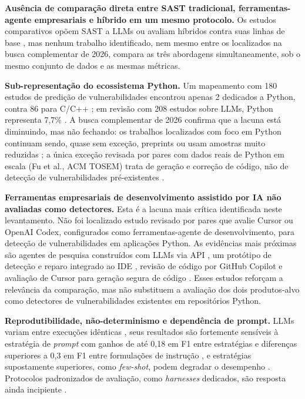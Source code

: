 \textbf{Ausência de comparação direta entre SAST tradicional, ferramentas-agente empresariais e híbrido em um mesmo protocolo.} Os estudos comparativos opõem SAST a LLMs \cite{Ozturk2023AIvsSAST, Tamberg2025LLMHarness, Gnieciak2025LLMvsSAST, Zhou2024SASTLLMRepo} ou avaliam híbridos contra suas linhas de base \cite{Ciavatta2026LLMSAST, Ameen2026QASecClaw}, mas nenhum trabalho identificado, nem mesmo entre os localizados na busca complementar de 2026, compara as três abordagens simultaneamente, sob o mesmo conjunto de dados e as mesmas métricas.

\textbf{Sub-representação do ecossistema Python.} Um mapeamento com 180 estudos de predição de vulnerabilidades encontrou apenas 2 dedicados a Python, contra 86 para C/C++ \cite{Kalouptsoglou2023VulnPrediction}; em revisão com 208 estudos sobre LLMs, Python representa 7,7\% \cite{Germano2025LLMSLR}. A busca complementar de 2026 confirma que a lacuna está diminuindo, mas não fechando: os trabalhos localizados com foco em Python continuam sendo, quase sem exceção, preprints \cite{Pellew2026RealVuln, Marquer2026SAGA, Tsigkourakos2026QRS, Zhou2024SASTLLMRepo, Adnan2026ALPHA} ou usam amostras muito reduzidas \cite{Farasat2025PythonSecurity}; a única exceção revisada por pares com dados reais de Python em escala (Fu et al., ACM TOSEM) trata de geração e correção de código, não de detecção de vulnerabilidades pré-existentes \cite{Fu2025CopilotSecurity}.

\textbf{Ferramentas empresariais de desenvolvimento assistido por IA não avaliadas como detectores.} Esta é a lacuna mais crítica identificada neste levantamento. Não foi localizado estudo revisado por pares que avalie Cursor ou OpenAI Codex, configurados como ferramentas-agente de desenvolvimento, para detecção de vulnerabilidades em aplicações Python. As evidências mais próximas são agentes de pesquisa construídos com LLMs via API \cite{Yildiz2025LLMAgents, Widyasari2026VulTrial}, um protótipo de detecção e reparo integrado ao IDE \cite{Steenhoek2025IDEUserStudy}, revisão de código por GitHub Copilot \cite{Amro2025CopilotReview} e avaliação de Cursor para geração segura de código \cite{Nie2025SecCodePLT}. Esses estudos reforçam a relevância da comparação, mas não substituem a avaliação dos dois produtos-alvo como detectores de vulnerabilidades existentes em repositórios Python.

\textbf{Reprodutibilidade, não-determinismo e dependência de prompt.} LLMs variam entre execuções idênticas \cite{Ozturk2023AIvsSAST}, seus resultados são fortemente sensíveis à estratégia de \textit{prompt} com ganhos de até 0,18 em F1 entre estratégias \cite{Khare2025LLMEffectiveness} e diferenças superiores a 0,3 em F1 entre formulações de instrução \cite{Iranmanesh2025ZeroFalse}, e estratégias supostamente superiores, como \textit{few-shot}, podem degradar o desempenho \cite{Lin2025LLMCompare}. Protocolos padronizados de avaliação, como \textit{harnesses} dedicados, são resposta ainda incipiente \cite{Tamberg2025LLMHarness}.

